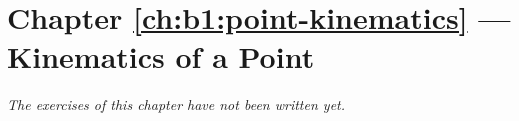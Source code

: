 \section*{Chapter \ref{ch:b1:point-kinematics} --- Kinematics of a Point}


\emph{The exercises of this chapter have not been written yet.}
